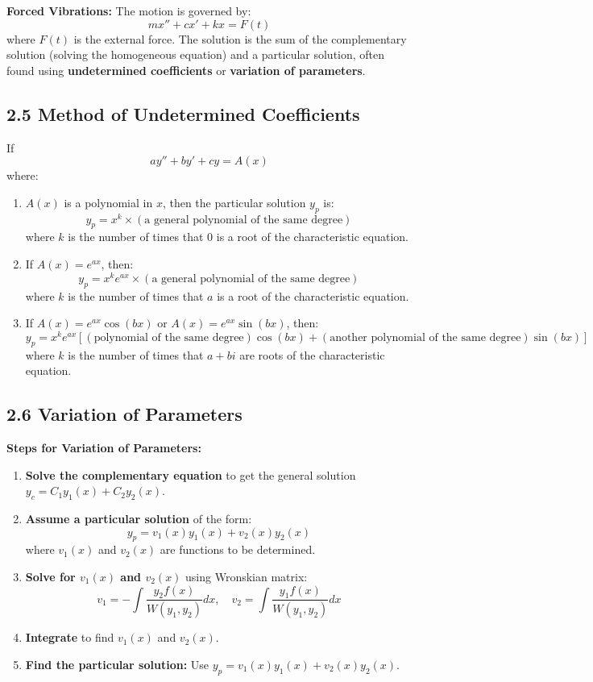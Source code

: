 \documentclass[10pt]{article}
\begin{document}
\textbf{Forced Vibrations:} The motion is governed by:
\[
mx'' + cx' + kx = F(t)
\]
where \( F(t) \) is the external force. The solution is the sum of the complementary solution (solving the homogeneous equation) and a particular solution, often found using \textbf{undetermined coefficients} or \textbf{variation of parameters}.

\subsection*{2.5 Method of Undetermined Coefficients}

If 
\[
ay'' + by' + cy = A(x)
\]
where:

\begin{enumerate}
    \item \( A(x) \) is a polynomial in \( x \), then the particular solution \( y_p \) is:
    \[
    y_p = x^k \times (\text{a general polynomial of the same degree})
    \]
    where \( k \) is the number of times that 0 is a root of the characteristic equation.
    
    \item If \( A(x) = e^{ax} \), then:
    \[
    y_p = x^k e^{ax} \times (\text{a general polynomial of the same degree})
    \]
    where \( k \) is the number of times that \( a \) is a root of the characteristic equation.
    
    \item If \( A(x) = e^{ax} \cos(bx) \) or \( A(x) = e^{ax} \sin(bx) \), then:
    \[
    y_p = x^k e^{ax} \left[ (\text{polynomial of the same degree}) \cos(bx) + (\text{another polynomial of the same degree}) \sin(bx) \right]
    \]
    where \( k \) is the number of times that \( a + bi \) are roots of the characteristic equation.
\end{enumerate}

\subsection*{2.6 Variation of Parameters}
\textbf{Steps for Variation of Parameters:}
\begin{enumerate}
    \item \textbf{Solve the complementary equation} to get the general solution \( y_c = C_1 y_1(x) + C_2 y_2(x) \).
    \item \textbf{Assume a particular solution} of the form:
    \[
    y_p = v_1(x) y_1(x) + v_2(x) y_2(x)
    \]
    where \( v_1(x) \) and \( v_2(x) \) are functions to be determined.
    \item \textbf{Solve for \( v_1(x) \) and \( v_2(x) \)} using Wronskian matrix:
    \[
    v_1 = -\int \frac{y_2 f(x)}{W(y_1,y_2)} dx, \quad v_2 = \int \frac{y_1 f(x)}{W(y_1,y_2)} dx
    \]
    \item \textbf{Integrate} to find \( v_1(x) \) and \( v_2(x) \).
    \item \textbf{Find the particular solution:} Use \( y_p = v_1(x) y_1(x) + v_2(x) y_2(x) \).
\end{enumerate}
\end{document}
